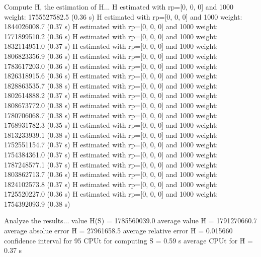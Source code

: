 Compute H̃, the estimation of H...
  H estimated with rp=[0, 0, 0] and 1000 weight:  1755527582.5  (0.36 s)
  H estimated with rp=[0, 0, 0] and 1000 weight:  1844026008.7  (0.37 s)
  H estimated with rp=[0, 0, 0] and 1000 weight:  1771899510.2  (0.36 s)
  H estimated with rp=[0, 0, 0] and 1000 weight:  1832114951.0  (0.37 s)
  H estimated with rp=[0, 0, 0] and 1000 weight:  1806823356.9  (0.36 s)
  H estimated with rp=[0, 0, 0] and 1000 weight:  1783617203.0  (0.36 s)
  H estimated with rp=[0, 0, 0] and 1000 weight:  1826318915.6  (0.36 s)
  H estimated with rp=[0, 0, 0] and 1000 weight:  1828863535.7  (0.38 s)
  H estimated with rp=[0, 0, 0] and 1000 weight:  1802614888.2  (0.37 s)
  H estimated with rp=[0, 0, 0] and 1000 weight:  1808673772.0  (0.38 s)
  H estimated with rp=[0, 0, 0] and 1000 weight:  1780706068.7  (0.38 s)
  H estimated with rp=[0, 0, 0] and 1000 weight:  1768931782.3  (0.35 s)
  H estimated with rp=[0, 0, 0] and 1000 weight:  1813233939.1  (0.38 s)
  H estimated with rp=[0, 0, 0] and 1000 weight:  1752551154.7  (0.37 s)
  H estimated with rp=[0, 0, 0] and 1000 weight:  1754384361.0  (0.37 s)
  H estimated with rp=[0, 0, 0] and 1000 weight:  1787248577.1  (0.37 s)
  H estimated with rp=[0, 0, 0] and 1000 weight:  1803862713.7  (0.36 s)
  H estimated with rp=[0, 0, 0] and 1000 weight:  1824102573.8  (0.37 s)
  H estimated with rp=[0, 0, 0] and 1000 weight:  1725520227.0  (0.36 s)
  H estimated with rp=[0, 0, 0] and 1000 weight:  1754392093.9  (0.38 s)

Analyze the results...
  value H(S)                  = 1785560039.0 
  average value H̃             = 1791270660.7 
  average absolue error H̃     = 27961658.5 
  average relative error H̃    = 0.015660 
  confidence interval for 95%
  CPUt for computing S         = 0.59 s
  average CPUt for H̃           = 0.37 s

